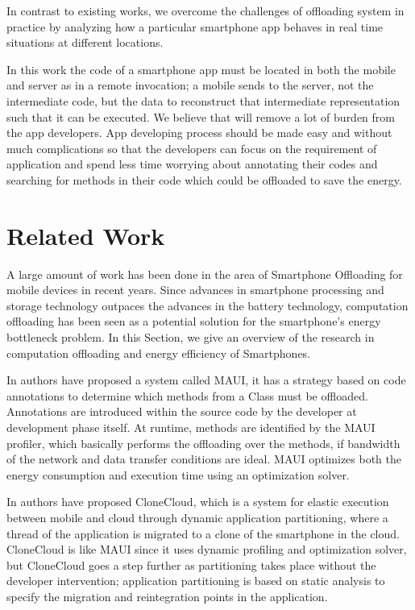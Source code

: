 \documentclass[12pt]{report}
\begin{document}
In contrast to existing works, we overcome the challenges of offloading system in practice by 
analyzing how a particular smartphone app behaves in real time situations at different locations.

In this work the code of a smartphone app must be located in both the mobile and server as in a
remote invocation; a mobile sends to the server, not the intermediate code, but the data to reconstruct that intermediate representation such that it can be executed. We believe that will remove a lot of burden from the app developers. App developing process should be made easy and without much complications so that the developers can focus on the requirement of application and spend less time worrying about annotating their codes and searching for methods in their code which could be offloaded to save the energy.

\chapter{Related Work} %
\label{chap:RelatedWork}

A large amount of work has been done in the area of Smartphone Offloading for mobile devices in
recent years. Since advances in smartphone processing and storage technology outpaces the advances in the battery
technology, computation offloading has been seen as a potential solution for the smartphone’s energy bottleneck problem.
In this Section, we give an overview of the research in computation offloading and energy efficiency of Smartphones.

In \cite{cuervo2010maui} authors have proposed a system called MAUI, it has a strategy based on code annotations to determine which methods from a Class must be offloaded. Annotations are introduced within the source code by the developer at development phase itself. At runtime, methods are identified by the MAUI profiler, which basically performs the offloading over the methods, if bandwidth of the network and data transfer conditions are ideal. MAUI optimizes both the energy consumption and execution
time using an optimization solver.

In \cite{chun2011clonecloud} authors have proposed CloneCloud, which is a system for elastic execution between mobile and
cloud through dynamic application partitioning, where a thread of the application is migrated to a clone of the
smartphone in the cloud. CloneCloud is like MAUI since it uses dynamic profiling and optimization solver, but CloneCloud goes a step further as partitioning takes place without the developer intervention; application partitioning is based on static analysis to specify the migration and reintegration points in the application. 
\end{document}
